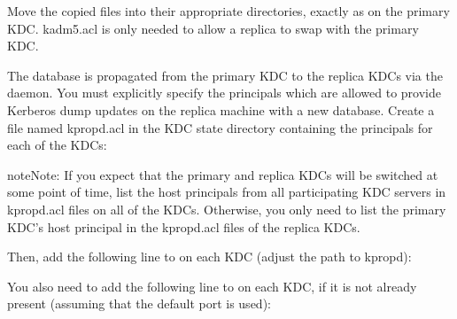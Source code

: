 \documentclass[letterpaper,10pt,english]{sphinxmanual}
\begin{document}
\sphinxAtStartPar
Move the copied files into their appropriate directories, exactly as
on the primary KDC.  kadm5.acl is only needed to allow a replica to
swap with the primary KDC.

\sphinxAtStartPar
The database is propagated from the primary KDC to the replica KDCs
via the {\hyperref[\detokenize{admin/admin_commands/kpropd:kpropd-8}]{}} daemon.  You must explicitly specify the
principals which are allowed to provide Kerberos dump updates on the
replica machine with a new database.  Create a file named kpropd.acl
in the KDC state directory containing the  principals for each
of the KDCs:

\begin{sphinxVerbatim}[commandchars=\\\{\}]
\end{sphinxVerbatim}

\begin{sphinxadmonition}{note}{Note:}
\sphinxAtStartPar
If you expect that the primary and replica KDCs will be
switched at some point of time, list the host principals
from all participating KDC servers in kpropd.acl files on
all of the KDCs.  Otherwise, you only need to list the
primary KDC’s host principal in the kpropd.acl files of the
replica KDCs.
\end{sphinxadmonition}

\sphinxAtStartPar
Then, add the following line to  on each KDC
(adjust the path to kpropd):

\begin{sphinxVerbatim}[commandchars=\\\{\}]
      
\end{sphinxVerbatim}

\sphinxAtStartPar
You also need to add the following line to  on each
KDC, if it is not already present (assuming that the default port is
used):
\end{document}
